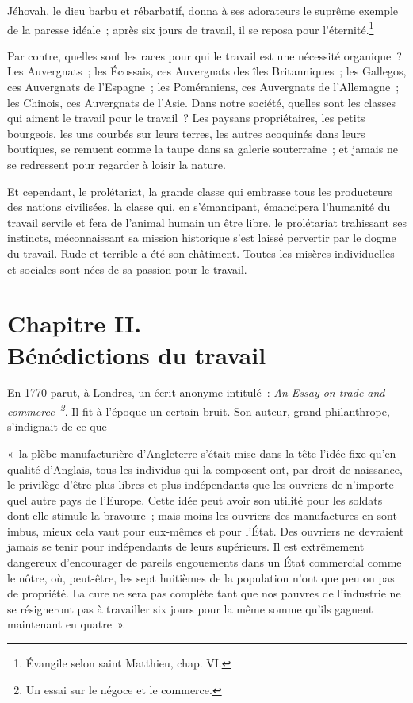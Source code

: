\documentclass[french,twoside]{book} %
\newenvironment{quoteblock}%
  {\begin{quoting}}
  {\end{quoting}}
\newcommand\chapteropen{} %
\newcommand\chaptercont{} %
\newcommand\chapterclose{} %
\newenvironment{quotebar}{%
    \def\FrameCommand{{\color{rubric!10!}\vrule width 0.5em} \hspace{0.9em}}%
    \def\OuterFrameSep{\itemsep} %
    \MakeFramed {\advance\hsize-\width \FrameRestore}
  }%
  {%
    \endMakeFramed
  }
\renewenvironment{quoteblock}%
  {%
    \savenotes
    \setstretch{0.9}
    \normalfont
    \begin{quotebar}
  }
  {%
    \end{quotebar}
    \spewnotes
  }
\begin{document}
\noindent Jéhovah, le dieu barbu et rébarbatif, donna à ses adorateurs le suprême exemple de la paresse idéale ; après six jours de travail, il se reposa pour l’éternité.\footnote{Évangile selon saint Matthieu, chap. VI.}\par
Par contre, quelles sont les races pour qui le travail est une nécessité organique ? Les Auvergnats ; les Écossais, ces Auvergnats des îles Britanniques ; les Gallegos, ces Auvergnats de l’Espagne ; les Poméraniens, ces Auvergnats de l’Allemagne ; les Chinois, ces Auvergnats de l’Asie. Dans notre société, quelles sont les classes qui aiment le travail pour le travail ? Les paysans propriétaires, les petits bourgeois, les uns courbés sur leurs terres, les autres acoquinés dans leurs boutiques, se remuent comme la taupe dans sa galerie souterraine ; et jamais ne se redressent pour regarder à loisir la nature.\par
Et cependant, le prolétariat, la grande classe qui embrasse tous les producteurs des nations civilisées, la classe qui, en s’émancipant, émancipera l’humanité du travail servile et fera de l’animal humain un être libre, le prolétariat trahissant ses instincts, méconnaissant sa mission historique s’est laissé pervertir par le dogme du travail. Rude et terrible a été son châtiment. Toutes les misères individuelles et sociales sont nées de sa passion pour le travail.
\chapterclose


\chapteropen
\chapter[Chapitre II. Bénédictions du travail]{Chapitre II. \\
Bénédictions du travail}\renewcommand{\leftmark}{Chapitre II. \\
Bénédictions du travail}


\chaptercont
\noindent En 1770 parut, à Londres, un écrit anonyme intitulé : \emph{An Essay on trade and commerce \footnote{Un essai sur le négoce et le commerce.}}. Il fit à l’époque un certain bruit. Son auteur, grand philanthrope, s’indignait de ce que\par

\begin{quoteblock}
 \noindent « la plèbe manufacturière d’Angleterre s’était mise dans la tête l’idée fixe qu’en qualité d’Anglais, tous les individus qui la composent ont, par droit de naissance, le privilège d’être plus libres et plus indépendants que les ouvriers de n’importe quel autre pays de l’Europe. Cette idée peut avoir son utilité pour les soldats dont elle stimule la bravoure ; mais moins les ouvriers des manufactures en sont imbus, mieux cela vaut pour eux-mêmes et pour l’État. Des ouvriers ne devraient jamais se tenir pour indépendants de leurs supérieurs. Il est extrêmement dangereux d’encourager de pareils engouements dans un État commercial comme le nôtre, où, peut-être, les sept huitièmes de la population n’ont que peu ou pas de propriété. La cure ne sera pas complète tant que nos pauvres de l’industrie ne se résigneront pas à travailler six jours pour la même somme qu’ils gagnent maintenant en quatre ».
\end{quoteblock}
\end{document}
